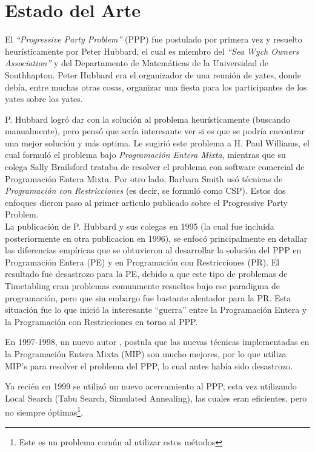 \documentclass[letter, 10pt]{article}
\begin{document}
\section{Estado del Arte}
El \textit{``Progressive Party Problem''} (PPP) fue postulado por primera vez y resuelto heurísticamente por Peter Hubbard, el cual es miembro del \textit{``Sea Wych Owners Association''} y del Departamento de Matemáticas de la Universidad de Southhapton. Peter Hubbard era el organizador de una reunión de yates, donde debía, entre muchas otras cosas, organizar una fiesta para los participantes de los yates sobre los yates. \cite{ProblemDescription}

P. Hubbard logró dar con la solución al problema heurísticamente (buscando manualmente), pero pensó que sería interesante ver si es que se podría encontrar una mejor solución y más optima. Le sugirió este problema a H. Paul Williams, el cual formuló el problema bajo \textit{Programación Entera Mixta}, mientras que su colega Sally Brailsford trataba de resolver el problema con software comercial de Programación Entera Mixta. Por otro lado, Barbara Smith usó técnicas de \textit{Programación con Restricciones} (es decir, se formuló como CSP). Estos dos enfoques dieron paso al primer articulo publicado sobre el Progressive Party Problem. \cite{FirstPublication}\\

La publicación de P. Hubbard y sus colegas en 1995 \cite{FirstPublication} (la cual fue incluida posteriormente en otra publicacion en 1996), se enfocó principalmente en detallar las diferencias empíricas que se obtuvieron al desarrollar la solución del PPP en Programación Entera (PE) y en Programación con Restricciones (PR). El resultado fue desastrozo para la PE, debido a que este tipo de problemas de Timetabling eran problemas comunmente resueltos bajo ese paradigma de programación, pero que sin embargo fue bastante alentador para la PR. Esta situación fue lo que inició la interesante ``guerra'' entre la Programación Entera y la Programación con Restricciones en torno al PPP.

En 1997-1998, un nuevo autor \cite{PseudoLocal,WalserThesis}, postula que las nuevas técnicas implementadas en la Programación Entera Mixta (MIP) son mucho mejores, por lo que utiliza MIP's para  resolver el problema del PPP, lo cual antes había sido desastrozo.

Ya recién en 1999 se utilizó un nuevo acercamiento al PPP, esta vez utilizando Local Search (Tabu Search, Simulated Annealing), las cuales eran eficientes, pero no siempre óptimas\footnote{Este es un problema común al utilizar estos métodos}.
\end{document}
